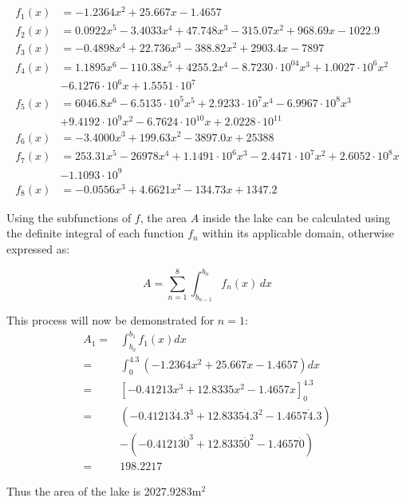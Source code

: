 \documentclass{article}
\theoremstyle{definition}
\begin{document}
    \begin{align*}
        f_1(x) &= -1.2364x^2 + 25.667x - 1.4657 \\
        f_2(x) &= 0.0922x^5 - 3.4033x^4 + 47.748x^3 - 315.07x^2 + 968.69x - 1022.9 \\
        f_3(x) &= -0.4898x^4 + 22.736x^3 - 388.82x^2 + 2903.4x - 7897 \\
        f_4(x) &= 1.1895x^6 - 110.38x^5 + 4255.2x^4 - 8.7230\cdot 10^04x^3 + 1.0027\cdot 10^6x^2 \\ &- 6.1276\cdot 10^6x + 1.5551\cdot 10^7 \\
        f_5(x) &= 6046.8x^6 - 6.5135 \cdot 10^5x^5 + 2.9233 \cdot 10^7x^4 - 6.9967 \cdot 10^8x^3 \\ &+ 9.4192 \cdot 10^9x^2 - 6.7624 \cdot 10^{10}x + 2.0228 \cdot 10^{11} \\
        f_6(x) &= -3.4000x^3 + 199.63x^2 - 3897.0x + 25388 \\
        f_7(x) &= 253.31x^5 - 26978x^4 + 1.1491 \cdot 10^6x^3 - 2.4471 \cdot 10^7x^2 + 2.6052 \cdot 10^8x \\ &- 1.1093 \cdot 10^9 \\
        f_8(x) &= -0.0556x^3 + 4.6621x^2 - 134.73x + 1347.2
    \end{align*}

    Using the subfunctions of $f$, the area $A$ inside the lake can be calculated using the definite integral of each function $f_n$ within its applicable domain, otherwise expressed as:

    \begin{equation}\label{eqnAreaOfLakeFromFuncs}
       A = \sum_{n=1}^8 \int_{b_{n-1}}^{b_n} f_n(x)\,dx
    \end{equation}

    This process will now be demonstrated for $n = 1$:
    \begin{align*}
        A_1 =& \int_{b_0}^{b_1} f_1(x)dx \\
        =& \int_{0}^{4.3} \left(-1.2364x^2 + 25.667x - 1.4657\right)dx \\
        =& \left[-0.41213x^3 + 12.8335x^2 - 1.4657x\right]_0^{4.3} \\
        =& (-0.41213 \dot 4.3^3 + 12.8335 \dot 4.3^2 - 1.4657 \dot 4.3) \\ &- (-0.41213 \dot 0^3 + 12.8335 \dot 0^2 - 1.4657 \dot 0) \\
        =& 198.2217
    \end{align*}

    Thus the area of the lake is 2027.9283m$^2$

\end{document}
